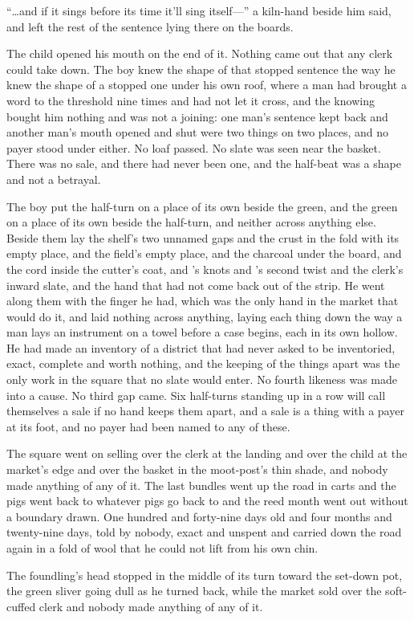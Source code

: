 “\ldots and if it sings before its time it'll sing itself---” a kiln-hand beside him said, and left the rest of the sentence lying there on the boards.

The child opened his mouth on the end of it. Nothing came out that any clerk could take down. The boy knew the shape of that stopped sentence the way he knew the shape of a stopped one under his own roof, where a man had brought a word to the threshold nine times and had not let it cross, and the knowing bought him nothing and was not a joining: one man's sentence kept back and another man's mouth opened and shut were two things on two places, and no payer stood under either. No loaf passed. No slate was seen near the basket. There was no sale, and there had never been one, and the half-beat was a shape and not a betrayal.

The boy put the half-turn on a place of its own beside the green, and the green on a place of its own beside the half-turn, and neither across anything else. Beside them lay the shelf's two unnamed gaps and the crust in the fold with its empty place, and the field's empty place, and the charcoal under the board, and the cord inside the cutter's coat, and 's knots and 's second twist and the clerk's inward slate, and the hand that had not come back out of the strip. He went along them with the finger he had, which was the only hand in the market that would do it, and laid nothing across anything, laying each thing down the way a man lays an instrument on a towel before a case begins, each in its own hollow. He had made an inventory of a district that had never asked to be inventoried, exact, complete and worth nothing, and the keeping of the things apart was the only work in the square that no slate would enter. No fourth likeness was made into a cause. No third gap came. Six half-turns standing up in a row will call themselves a sale if no hand keeps them apart, and a sale is a thing with a payer at its foot, and no payer had been named to any of these.

The square went on selling over the clerk at the landing and over the child at the market's edge and over the basket in the moot-post's thin shade, and nobody made anything of any of it. The last bundles went up the road in carts and the pigs went back to whatever pigs go back to and the reed month went out without a boundary drawn. One hundred and forty-nine days old and four months and twenty-nine days, told by nobody, exact and unspent and carried down the road again in a fold of wool that he could not lift from his own chin.

The foundling's head stopped in the middle of its turn toward the set-down pot, the green sliver going dull as he turned back, while the market sold over the soft-cuffed clerk and nobody made anything of any of it.
